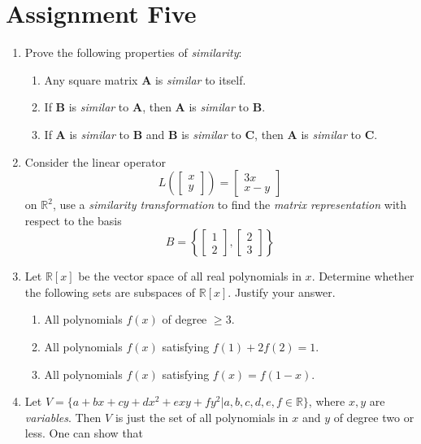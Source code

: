 \section{Assignment Five}
\begin{enumerate}
\item
Prove the following properties of \textit{similarity}:
\begin{enumerate}
\item
Any square matrix $\bm A$ is \textit{similar} to itself.
\item
If $\bm B$ is \textit{similar} to $\bm A$, then $\bm A$ is \textit{similar} to $\bm B$.
\item
If $\bm A$ is \textit{similar} to $\bm B$ and $\bm B$ is \textit{similar} to $\bm C$, then $\bm A$ is \textit{similar} to $\bm C$.
\end{enumerate}
\item
Consider the linear operator
\[
L\left(\begin{bmatrix}
x\\y
\end{bmatrix}\right)=\begin{bmatrix}
3x\\x-y
\end{bmatrix}
\]
on $\mathbb{R}^2$, use a \textit{similarity transformation} to find the \textit{matrix representation} with respect to the basis
\[
B=\left\{
\begin{bmatrix}
1\\2
\end{bmatrix},\begin{bmatrix}
2\\3
\end{bmatrix}
\right\}
\]
\item
Let $\mathbb{R}[x]$ be the vector space of all real polynomials in $x$. Determine whether the
following sets are subspaces of $\mathbb{R}[x]$. Justify your answer.
\begin{enumerate}
\item
All polynomials $f(x)$ of degree $\ge3$.
\item
All polynomials $f(x)$ satisfying $f(1)+2f(2)=1$.
\item
All polynomials $f(x)$ satisfying $f(x)=f(1-x)$.
\end{enumerate}
\item
Let $V=\{a+bx+cy+dx^2+exy+fy^2|a,b,c,d,e,f\in\mathbb{R}\}$, where $x,y$ are \textit{variables}. Then $V$ is just the set of all polynomials in $x$ and $y$ of degree two or less. One can show that

\end{enumerate}

